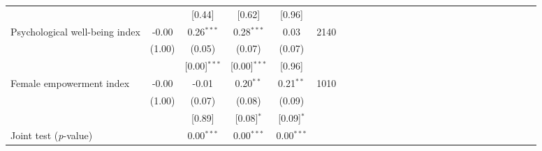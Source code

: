 {\begin{tabular}{l*{5}{SSSSc}}
          &         &   [0.44]&   [0.62]&   [0.96]&         \\
Psychological well-being index&    -0.00&0.26$^{***}$&0.28$^{***}$&     0.03&     2140\\
          &   (1.00)&   (0.05)&   (0.07)&   (0.07)&         \\
          &         &[0.00]$^{***}$&[0.00]$^{***}$&   [0.96]&         \\
Female empowerment index&    -0.00&    -0.01&0.20$^{**}$&0.21$^{**}$&     1010\\
          &   (1.00)&   (0.07)&   (0.08)&   (0.09)&         \\
          &         &   [0.89]&[0.08]$^{*}$&[0.09]$^{*}$&         \\
\midrule Joint test (\emph{p}-value)&         &{0.00$^{***}$}&{0.00$^{***}$}&{0.00$^{***}$}&         \\
\bottomrule
\end{tabular}
}

